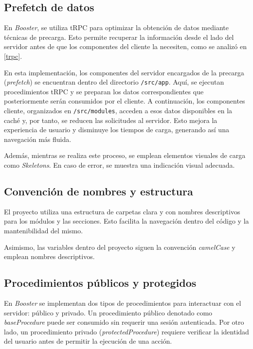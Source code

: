 \subsection{Prefetch de datos}
\label{prefetch}

En \textit{Booster}, se utiliza tRPC para optimizar la obtención de datos mediante técnicas de precarga. Esto permite recuperar la información desde el lado del servidor antes de que los componentes del cliente la necesiten, como se analizó en \ref{trpc}.  

En esta implementación, los componentes del servidor encargados de la precarga (\textit{prefetch}) se encuentran dentro del directorio \texttt{/src/app}. Aquí, se ejecutan procedimientos tRPC y se preparan los datos correspondientes que posteriormente serán consumidos por el cliente. A continuación, los componentes cliente, organizados en \texttt{/src/modules}, acceden a esos datos disponibles en la caché y, por tanto, se reducen las solicitudes al servidor. Esto mejora la experiencia de usuario y disminuye los tiempos de carga, generando así una navegación más fluida.

Además, mientras se realiza este proceso, se emplean elementos visuales de carga como \textit{Skeletons}. En caso de error, se muestra una indicación visual adecuada. 

\subsection{Convención de nombres y estructura}

El proyecto utiliza una estructura de carpetas clara y con nombres descriptivos para los módulos y las secciones. Esto facilita la navegación dentro del código y la mantenibilidad del mismo. 

Asimismo, las variables dentro del proyecto siguen la convención \textit{camelCase} y emplean nombres descriptivos.

\subsection{Procedimientos públicos y protegidos}

En \textit{Booster} se implementan dos tipos de procedimientos para interactuar con el servidor: público y privado. Un procedimiento público denotado como \textit{baseProcedure} puede ser consumido sin requerir una sesión autenticada. Por otro lado, un procedimiento privado (\textit{protectedProcedure}) requiere verificar la identidad del usuario antes de permitir la ejecución de una acción.

